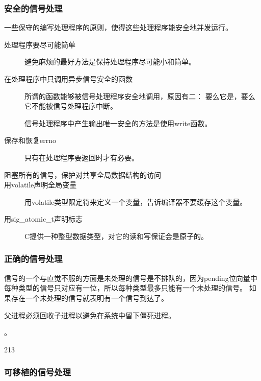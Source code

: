 {{        \subsubsection{安全的信号处理}
        {
            一些保守的编写处理程序的原则，使得这些处理程序能安全地并发运行。

            \begin{description}
                \item[处理程序要尽可能简单] 避免麻烦的最好方法是保持处理程序尽可能小和简单。
                \item[在处理程序中只调用异步信号安全的函数]
                {
                    所谓的函数能够被信号处理程序安全地调用，原因有二：
                    要么它是，要么它不能被信号处理程序中断。

                    信号处理程序中产生输出唯一安全的方法是使用write函数。
                }
                \item[保存和恢复errno] 只有在处理程序要返回时才有必要。
                \item[阻塞所有的信号，保护对共享全局数据结构的访问]
                \item[用volatile声明全局变量] 用volatile类型限定符来定义一个变量，告诉编译器不要缓存这个变量。
                \item[用sig_atomic_t声明标志] C提供一种整型数据类型，对它的读和写保证会是原子的。
            \end{description}
        }

        \subsubsection{正确的信号处理}
        {
            信号的一个与直觉不服的方面是未处理的信号是不排队的，因为pending位向量中每种类型的信号只对应有一位，所以每种类型最多只能有一个未处理的信号。
            如果存在一个未处理的信号就表明有一个信号到达了。

            父进程必须回收子进程以避免在系统中留下僵死进程。

            。

            \begin{practicec}
                213
            \end{practicec}
        }

        \subsubsection{可移植的信号处理}
        {

        }
    }
}
